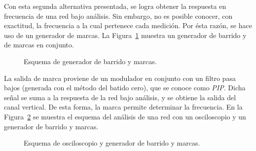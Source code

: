     Con esta segunda alternativa presentada, se logra obtener la respuesta en frecuencia de 
    una red bajo análisis. Sin embargo, no es posible conocer, con exactitud, la frecuencia 
    a la cual pertenece cada medición. Por ésta razón, se hace uso de un generador de marcas.
    La Figura~\ref{fig:GenBarridoYMarca} muestra un generador de barrido y de marcas en 
    conjunto. 
      \begin{figure}[H]
        \centering
          \caption{Esquema de generador de barrido y marcas.}
          \label{fig:GenBarridoYMarca}
      \end{figure}

    La salida de marca proviene de un modulador en conjunto con un filtro pasa bajos 
    (generada con el método del batido cero), que se conoce como \textit{PIP}.
    Dicha señal se suma a la respuesta de la red bajo análisis, y se obtiene la salida 
    del canal vertical. De esta forma, la marca permite determinar la frecuencia. En la 
    Figura~\ref{fig:GenBarridoYMarcaOscilos} se muestra el esquema del análisis de una 
    red con un osciloscopio y un generador de barrido y marcas. 
      \begin{figure}[H]
        \centering
          \caption{Esquema de osciloscopio y generador de barrido y marcas.}
          \label{fig:GenBarridoYMarcaOscilos}
      \end{figure}



